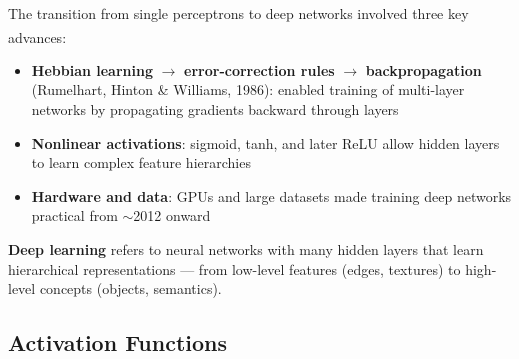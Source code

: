 \begin{tcbitemize}[ skin=sectionraster ]
\begin{center}
    \end{center}

    \tcbitem[title={From Perceptrons to Deep Learning}, raster multicolumn=6]
    The transition from single perceptrons to deep networks involved three key advances\textsuperscript{\cite[][pp.~1--3]{fleuretLittleBookDeep}}:
    \begin{itemize}
        \item \textbf{Hebbian learning} $\to$ \textbf{error-correction rules} $\to$ \textbf{backpropagation} (Rumelhart, Hinton \& Williams, 1986): enabled training of multi-layer networks by propagating gradients backward through layers
        \item \textbf{Nonlinear activations}: sigmoid, tanh, and later ReLU allow hidden layers to learn complex feature hierarchies
        \item \textbf{Hardware and data}: GPUs and large datasets made training deep networks practical from $\sim$2012 onward
    \end{itemize}
    \textbf{Deep learning} refers to neural networks with many hidden layers that learn hierarchical representations --- from low-level features (edges, textures) to high-level concepts (objects, semantics).
\end{tcbitemize}

\subsection{Activation Functions}

